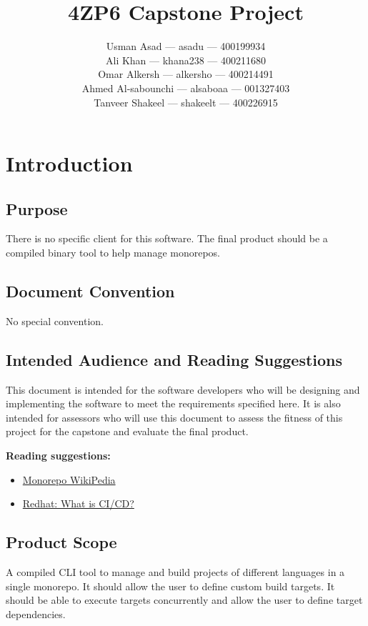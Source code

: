 \documentclass[11pt]{article}
\title{\textbf{4ZP6 Capstone Project}}
\author{Usman Asad --- asadu  --- 400199934\\
Ali Khan --- khana238  --- 400211680\\
Omar Alkersh --- alkersho --- 400214491 \\
Ahmed Al-sabounchi --- alsaboaa --- 001327403 \\
Tanveer Shakeel --- shakeelt --- 400226915}
\begin{document}
\maketitle
\tableofcontents
\newpage
\section{Introduction}
\subsection{Purpose}

There is no specific client for this software. The final product should be a
compiled binary tool to help manage monorepos.

\subsection{Document Convention}

No special convention.

\subsection{Intended Audience and Reading Suggestions}

This document is intended for the software developers who will be designing and
implementing the software to meet the requirements specified here. It is also
intended for assessors who will use this document to assess the fitness of this
project for the capstone and evaluate the final product.

\textbf{Reading suggestions:}
\begin{itemize}
  \item \href{https://en.wikipedia.org/wiki/Monorepo}{Monorepo WikiPedia}
  \item \href{https://www.redhat.com/en/topics/devops/what-is-ci-cd}{Redhat:
      What is CI/CD?}
\end{itemize}

\subsection{Product Scope}

A compiled CLI tool to manage and build projects of different languages in a
single monorepo. It should allow the user to define custom build \glspl{target}.
It should be able to execute \glspl{target} concurrently and allow the user to
define \gls{target} dependencies.
\end{document}
